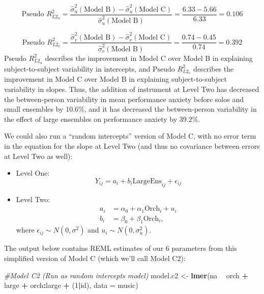 \documentclass[
]{krantz}
\newenvironment{Shaded}{\begin{snugshade}}{\end{snugshade}}
\newcommand{\CommentTok}[1]{\textcolor[rgb]{0.37,0.37,0.37}{\textit{#1}}}
\newcommand{\DataTypeTok}[1]{\textcolor[rgb]{0.27,0.27,0.27}{#1}}
\newcommand{\DecValTok}[1]{\textcolor[rgb]{0.06,0.06,0.06}{#1}}
\newcommand{\KeywordTok}[1]{\textcolor[rgb]{0.27,0.27,0.27}{\textbf{#1}}}
\newcommand{\NormalTok}[1]{#1}
\newcommand{\OperatorTok}[1]{\textcolor[rgb]{0.43,0.43,0.43}{\textbf{#1}}}
\newcommand{\StringTok}[1]{\textcolor[rgb]{0.5,0.5,0.5}{#1}}
\begin{document}
\begin{equation*}
\textrm{Pseudo }R^2_{L2_u} = \frac{\hat{\sigma}_{u}^{2}(\textrm{Model B})-\hat{\sigma}_{u}^{2}(\textrm{Model C})}{\hat{\sigma}_{u}^{2}(\textrm{Model B})} = \frac{6.33-5.66}{6.33} = 0.106
\end{equation*}

\begin{equation*}
\textrm{Pseudo }R^2_{L2_v} = \frac{\hat{\sigma}_{v}^{2}(\textrm{Model B})-\hat{\sigma}_{v}^{2}(\textrm{Model C})}{\hat{\sigma}_{v}^{2}(\textrm{Model B})} = \frac{0.74-0.45}{0.74} = 0.392
\end{equation*}
\(\textrm{Pseudo }R^2_{L2_u}\) describes the improvement in Model C over Model B in explaining subject-to-subject variability in intercepts, and \(\textrm{Pseudo }R^2_{L2_v}\) describes the improvement in Model C over Model B in explaining subject-to-subject variability in slopes. Thus, the addition of instrument at Level Two has decreased the between-person variability in mean performance anxiety before solos and small ensembles by 10.6\%, and it has decreased the between-person variability in the effect of large ensembles on performance anxiety by 39.2\%.

We could also run a ``random intercepts'' version of Model C, with no error term in the equation for the slope at Level Two (and thus no covariance between errors at Level Two as well):

\begin{itemize}
\item
  Level One:
  \begin{equation*}
  Y_{ij} = a_{i}+b_{i}\textrm{LargeEns}_{ij}+\epsilon_{ij}
  \end{equation*}
\item
  Level Two:
  \begin{align*}
  a_{i} & = \alpha_{0}+\alpha_{1}\textrm{Orch}_{i}+u_{i} \\
  b_{i} & = \beta_{0}+\beta_{1}\textrm{Orch}_{i},
  \end{align*}
  where \(\epsilon_{ij}\sim N(0,\sigma^2)\) and \(u_{i}\sim N(0,\sigma_{u}^{2})\).
\end{itemize}

The output below contains REML estimates of our 6 parameters from this simplified version of Model C (which we'll call Model C2):

\begin{Shaded}
\begin{Highlighting}[]
\CommentTok{#Model C2 (Run as random intercepts model)}
\NormalTok{model.c2 <-}\StringTok{ }\KeywordTok{lmer}\NormalTok{(na }\OperatorTok{~}\StringTok{ }\NormalTok{orch }\OperatorTok{+}\StringTok{ }\NormalTok{large }\OperatorTok{+}\StringTok{ }\NormalTok{orch}\OperatorTok{:}\NormalTok{large }\OperatorTok{+}
\StringTok{  }\NormalTok{(}\DecValTok{1}\OperatorTok{|}\NormalTok{id), }\DataTypeTok{data =}\NormalTok{ music)}
\end{Highlighting}
\end{Shaded}
\end{document}
